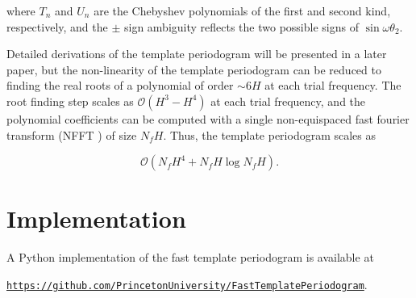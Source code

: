 \documentclass{webofc}
\newcommand{\bigO}{\mathcal{O}}
\begin{document}
\noindent where $T_n$ and $U_n$ are the Chebyshev polynomials of the first and second kind, respectively, and the $\pm$ sign ambiguity
reflects the two possible signs of $\sin{\omega\theta_2}$. 

Detailed derivations of the template periodogram will be presented in a later paper, but the non-linearity of the template periodogram
can be reduced to finding the real roots of a polynomial of order $\sim 6H$ at each trial frequency. The root finding step 
scales as $\bigO(H^3-H^4)$ at each trial frequency, and the polynomial coefficients can be computed with a single non-equispaced 
fast fourier transform (NFFT \cite{NFFT}) of size $N_fH$. Thus, the template periodogram scales as 

\begin{equation}\label{eq:scaling}
\bigO( N_fH^4 + N_f H\log N_f H ).
\end{equation}


\section{Implementation}\label{sec:implementation}
A Python implementation of the fast template periodogram is available at 
\begin{center}
\href{https://github.com/PrincetonUniversity/FastTemplatePeriodogram}{\tt https://github.com/PrincetonUniversity/FastTemplatePeriodogram}. 
\end{center}
\end{document}
